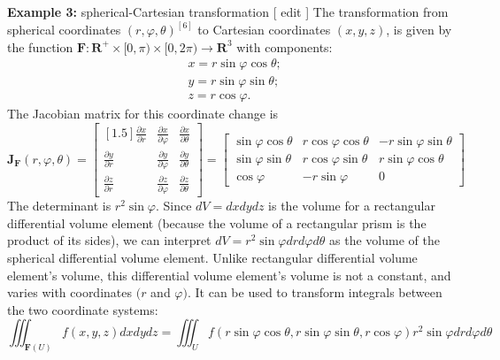 \documentclass[14pt]{article}
\theoremstyle{definition}
\theoremstyle{remark}
\begin{document}
\textbf{Example 3:} spherical-Cartesian transformation [ edit ]
The transformation from spherical coordinates $(r, \varphi, \theta)^{[6]}$ to Cartesian coordinates $(x, y, z)$, is given by the function $\mathbf{F}: \mathbf{R}^{+} \times[0, \pi) \times[0,2 \pi) \rightarrow \mathbf{R}^3$ with components:
$$
    \begin{aligned}
         & x=r \sin \varphi \cos \theta ; \\
         & y=r \sin \varphi \sin \theta ; \\
         & z=r \cos \varphi .
    \end{aligned}
$$
The Jacobian matrix for this coordinate change is
$$
    \mathbf{J}_{\mathbf{F}}(r, \varphi, \theta)=\begin{bmatrix}[1.5]
        \frac{\partial x}{\partial r} & \frac{\partial x}{\partial \varphi} & \frac{\partial x}{\partial \theta} \\
        \frac{\partial y}{\partial r} & \frac{\partial y}{\partial \varphi} & \frac{\partial y}{\partial \theta} \\
        \frac{\partial z}{\partial r} & \frac{\partial z}{\partial \varphi} & \frac{\partial z}{\partial \theta}
    \end{bmatrix}=\left[\begin{array}{ccc}
            \sin \varphi \cos \theta & r \cos \varphi \cos \theta & -r \sin \varphi \sin \theta \\
            \sin \varphi \sin \theta & r \cos \varphi \sin \theta & r \sin \varphi \cos \theta  \\
            \cos \varphi             & -r \sin \varphi            & 0
        \end{array}\right]
$$
The determinant is $r^2 \sin \varphi$. Since $d V=d x d y d z$ is the volume for a rectangular differential volume element (because the volume of a rectangular prism is the product of its sides), we can interpret $d V=r^2 \sin \varphi d r d \varphi d \theta$ as the volume of the spherical differential volume element. Unlike rectangular differential volume element's volume, this differential volume element's volume is not a constant, and varies with coordinates $(r$ and $\varphi)$. It can be used to transform integrals between the two coordinate systems:
$$
    \iiint_{\mathbf{F}(U)} f(x, y, z) d x d y d z=\iiint_U f(r \sin \varphi \cos \theta, r \sin \varphi \sin \theta, r \cos \varphi) r^2 \sin \varphi d r d \varphi d \theta
$$
\end{document}
